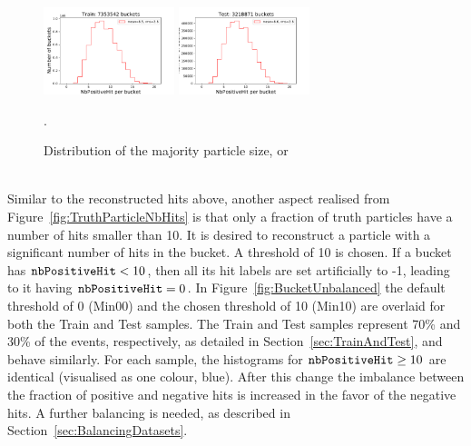\begin{figure}[htb]
\centering
\includegraphics[width=0.34\textwidth]{plots/plot_bucket_unbalanced_Train_2.pdf}
\includegraphics[width=0.34\textwidth]{plots/plot_bucket_unbalanced_Test_2.pdf}
\caption{Distribution of the majority particle size, or \nbPositiveHit}
\label{fig:BucketNbPositiveHit}.
\end{figure}

\ \\Similar to the reconstructed hits above, another aspect realised from Figure~\ref{fig:TruthParticleNbHits} is that only a fraction of truth particles have a number of hits smaller than 10. It is desired to reconstruct a particle with a significant number of hits in the bucket. A threshold of 10 is chosen. If a bucket has $\nbPositiveHit < 10$, then all its hit labels are set artificially to -1, leading to it having $\nbPositiveHit = 0$. In Figure~\ref{fig:BucketUnbalanced} the default threshold of 0 (Min00) and the chosen threshold of 10 (Min10) are overlaid for both the Train and Test samples. The Train and Test samples represent 70\% and 30\% of the events, respectively, as detailed in Section~\ref{sec:TrainAndTest}, and behave similarly. For each sample, the histograms for $\nbPositiveHit \ge 10$ are identical (visualised as one colour, blue). After this change the imbalance between the fraction of positive and negative hits is increased in the favor of the negative hits. A further balancing is needed, as described in Section~\ref{sec:BalancingDatasets}. 

